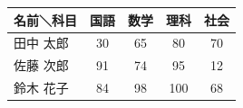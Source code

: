 \documentclass{ltjsarticle}
\begin{document}
\begin{table}[htbp]
  \begin{tabular}{|l||c|c|c|c|}
    \hline
    名前＼科目 & 国語 & 数学 & 理科 & 社会 \\
    \hline \hline
    田中 太郎 & 30 & 65 & 80 & 70 \\
    \hline
    佐藤 次郎 & 91 & 74 & 95 & 12 \\
    \hline
    鈴木 花子 & 84 & 98 & 100 & 68 \\
    \hline
  \end{tabular}
\end{table}
\end{document}
